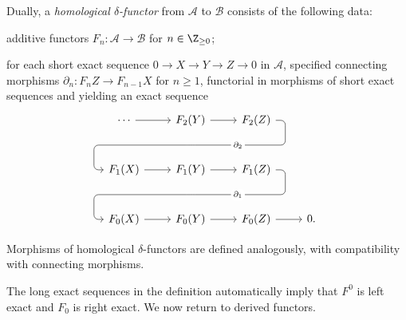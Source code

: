 \begin{definition}
	Dually, a \emph{homological $\delta$-functor} from $\mathcal{A}$ to
	$\mathcal{B}$ consists of the following data:
	\begin{compactitem}
		\item additive functors $F_n:\mathcal{A}\to\mathcal{B}$ for
		$n\in\Z_{\geq0}$;
		\item for each short exact sequence $0\to X\to Y\to Z\to0$ in
		$\mathcal{A}$, specified connecting morphisms
		$\partial_n:F_nZ\to F_{n-1}X$ for $n\geq1$, functorial in morphisms of
		short exact sequences and yielding an exact sequence
		\begin{equation*}\begin{tikzcd}[row sep=large]
			\cdots \arrow[r] & F_2(Y) \arrow[r] \arrow[phantom, d, ""{coordinate, name=A}] & F_2(Z) \arrow[dll, rounded corners, "{\partial_2}" description, to path={
				-- ([xshift=2ex]\tikztostart.east)
				|- (A) [near end]\tikztonodes
				-| ([xshift=-2ex]\tikztotarget.west)
				-- (\tikztotarget)}] & \\
			F_1(X) \arrow[r] & F_1(Y) \arrow[r] \arrow[phantom, d, ""{coordinate, name=B}] & F_1(Z) \arrow[dll, rounded corners, "{\partial_1}" description, to path={
				-- ([xshift=2ex]\tikztostart.east)
				|- (B) [near end]\tikztonodes
				-| ([xshift=-2ex]\tikztotarget.west)
				-- (\tikztotarget)}] & \\
			F_0 (X) \arrow[r] & F_0 (Y) \arrow[r] & F_0 (Z) \arrow[r] & 0.
		\end{tikzcd}\end{equation*}
	\end{compactitem}
	Morphisms of homological $\delta$-functors are defined analogously, with
	compatibility with connecting morphisms.
\end{definition}

The long exact sequences in the definition automatically imply that $F^0$ is
left exact and $F_0$ is right exact. We now return to derived functors.

